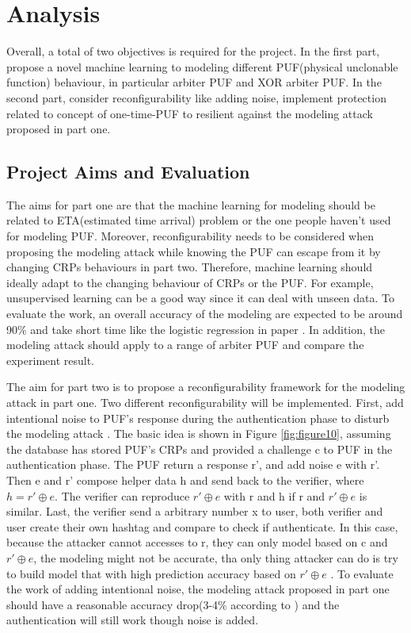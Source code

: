 \chapter{Analysis}
Overall, a total of two objectives is required for the project. In the first part, propose a novel machine learning to modeling different PUF(physical unclonable function)
behaviour, in particular arbiter PUF and XOR arbiter PUF. In the second part, consider reconfigurability like adding noise, implement protection related to concept of one-time-PUF to resilient against the modeling attack
proposed in part one.

\section{Project Aims and Evaluation}
The aims for part one are that the machine learning for modeling should be related to ETA(estimated time arrival) problem or the one people haven't used for modeling
PUF. Moreover, reconfigurability needs to be considered when proposing the modeling attack while knowing the PUF can escape from it by changing CRPs behaviours in part 
two. Therefore, machine learning should ideally adapt to the changing behaviour of CRPs or the PUF. For example, unsupervised learning can be a good way since it can 
deal with unseen data. To evaluate the work, an overall accuracy of the modeling are expected to be around 90\% and take short time like the logistic regression in 
paper \cite{Reference6}. In addition, the modeling attack should apply to a range of arbiter PUF and compare the experiment result.

The aim for part two is to propose a reconfigurability framework for the modeling attack in part one. Two different reconfigurability will be implemented. First, add intentional
noise to PUF's response during the authentication phase to disturb the modeling attack \cite{Reference8}. The basic idea is shown in Figure \ref{fig:figure10}, assuming the database has stored PUF's CRPs and provided a challenge c
to PUF in the authentication phase. The PUF return a response r', and add noise e with r'. Then e and r' compose helper data h and send back to the verifier, where $h = r'\oplus e$. The verifier can reproduce $r'\oplus e$  
with r and h if r and $r'\oplus e$ is similar. Last, the verifier send a arbitrary number x to user, both verifier and user create their own hashtag and compare to check if authenticate. In this case, because the attacker cannot accesses to r, they can only model based on c and $r'\oplus e$, the modeling
might not be accurate, tha only thing attacker can do is try to build model that with high prediction accuracy based on $r'\oplus e$ \cite{Reference8}. To evaluate the work of adding intentional noise, the modeling attack proposed in part one should have a reasonable accuracy drop(3-4\% according to \cite{Reference8}) and the authentication will still work 
though noise is added.

